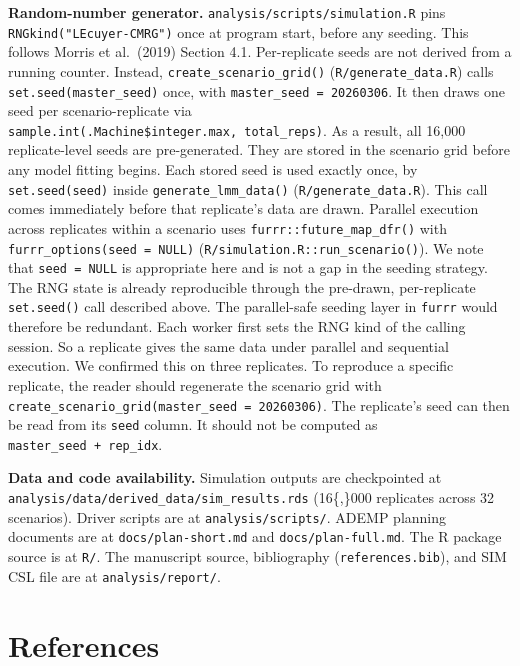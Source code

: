 \documentclass[
  11pt,
]{article}
\begin{document}
\textbf{Random-number generator.} \texttt{analysis/scripts/simulation.R}
pins \texttt{RNGkind("L\textquotesingle{}Ecuyer-CMRG")} once at program start, before any
seeding. This follows Morris et al.~(2019) Section 4.1.
Per-replicate seeds are not derived from a running counter.
Instead, \texttt{create\_scenario\_grid()} (\texttt{R/generate\_data.R}) calls
\texttt{set.seed(master\_seed)} once, with \texttt{master\_seed\ =\ 20260306}. It
then draws one seed per scenario-replicate via
\texttt{sample.int(.Machine\$integer.max,\ total\_reps)}. As a result, all
16,000 replicate-level seeds are pre-generated. They are stored
in the scenario grid before any model fitting begins. Each stored
seed is used exactly once, by \texttt{set.seed(seed)} inside
\texttt{generate\_lmm\_data()} (\texttt{R/generate\_data.R}). This call comes
immediately before that replicate's data are drawn. Parallel
execution across replicates within a scenario uses
\texttt{furrr::future\_map\_dfr()} with \texttt{furrr\_options(seed\ =\ NULL)}
(\texttt{R/simulation.R::run\_scenario()}). We note that \texttt{seed\ =\ NULL} is
appropriate here and is not a gap in the seeding strategy. The
RNG state is already reproducible through the pre-drawn,
per-replicate \texttt{set.seed()} call described above. The
parallel-safe seeding layer in \texttt{furrr} would therefore be
redundant. Each worker first sets the RNG kind of the calling
session. So a replicate gives the same data under parallel and
sequential execution. We confirmed this on three replicates. To
reproduce a specific replicate, the reader should
regenerate the scenario grid with
\texttt{create\_scenario\_grid(master\_seed\ =\ 20260306)}. The replicate's
seed can then be read from its \texttt{seed} column. It should not be
computed as \texttt{master\_seed\ +\ rep\_idx}.

\textbf{Data and code availability.} Simulation outputs are
checkpointed at
\texttt{analysis/data/derived\_data/sim\_results.rds} (16\{,\}000
replicates across 32 scenarios). Driver scripts are at
\texttt{analysis/scripts/}. ADEMP planning documents are at
\texttt{docs/plan-short.md} and \texttt{docs/plan-full.md}. The R package
source is at \texttt{R/}. The manuscript source, bibliography
(\texttt{references.bib}), and SIM CSL file are at
\texttt{analysis/report/}.

\section*{References}\label{references}
\end{document}
